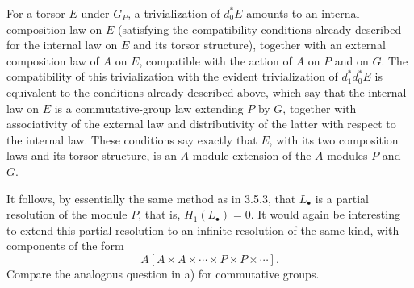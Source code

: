 For a torsor $E$ under $G_P$, a trivialization of $d_0^*E$ amounts
to an internal composition law on $E$ (satisfying the compatibility
conditions already described for the internal law on $E$ and its
torsor structure), together with an external composition law of $A$
on $E$, compatible with the action of $A$ on $P$ and on $G$.  The
compatibility of this trivialization with the evident trivialization
of $d_1^*d_0^*E$ is equivalent to the conditions already described
above, which say that the internal law on $E$ is a commutative-group
law extending $P$ by $G$, together with associativity of the external
law and distributivity of the latter with respect to the internal
law.  These conditions say exactly that $E$, with its two
composition laws and its torsor structure, is an $A$-module extension
of the $A$-modules $P$ and $G$.

It follows, by essentially the same method as in 3.5.3, that
$L_\bullet$ is a partial resolution of the module $P$, that is,
$H_1(L_\bullet)=0$.  It would again be interesting to extend this
partial resolution to an infinite resolution of the same kind, with
components of the form
\[
 A[A\times A\times\cdots\times P\times P\times\cdots].
\]
Compare the analogous question in a) for commutative groups.
